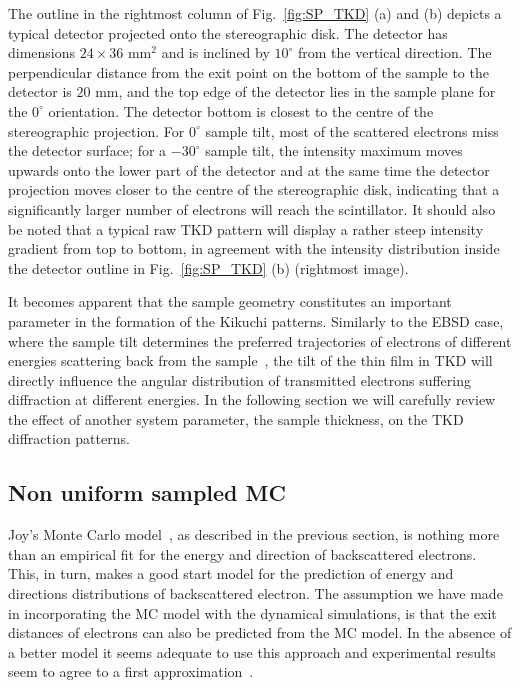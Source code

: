 The outline in the rightmost column of Fig.~\ref{fig:SP_TKD} (a) and (b) depicts a typical detector projected onto the stereographic disk.  The detector has dimensions $24\times 36$ mm$^2$ and is inclined by $10^{\circ}$ from the vertical direction.  The perpendicular distance from the exit point on the bottom of the sample to the detector is $20$ mm, and the top edge of the detector lies in the sample plane for the $0^{\circ}$ orientation.  The detector bottom is closest to the centre of the stereographic projection.  For $0^{\circ}$ sample tilt, most of the scattered electrons miss the detector surface; for a $-30^{\circ}$ sample tilt, the intensity maximum moves upwards onto the lower part of the detector and at the same time the detector projection moves closer to the centre of the stereographic disk, indicating that a significantly larger number of electrons will reach the scintillator.  It should also be noted that a typical raw TKD pattern will display a rather steep intensity gradient from top to bottom, in agreement with the intensity distribution inside the detector outline in Fig.~\ref{fig:SP_TKD} (b) (rightmost image).



It becomes apparent that the sample geometry constitutes an important parameter in the formation of the Kikuchi patterns. Similarly to the EBSD case, where the sample tilt determines the preferred trajectories of electrons of different energies scattering back from the sample~\cite{degraef2013e}, the tilt of the thin film in TKD will directly influence the angular distribution of transmitted electrons suffering diffraction at different energies. In the following section we will carefully review the effect of another system parameter, the sample thickness, on the TKD diffraction patterns. 



\subsection{Non uniform sampled MC}


Joy's Monte Carlo model~\cite{joy1995a}, as described in the previous section, is nothing more than an empirical fit for the energy and direction of backscattered electrons. This, in turn, makes a good start model for the prediction of energy and directions distributions of backscattered electron. The assumption we have made in incorporating the MC model with the dynamical simulations, is that the exit distances of electrons can also be predicted from the MC model. In the absence of a better model it seems adequate to use this approach and experimental results seem to agree to a first approximation~\cite{Deal08}. 

